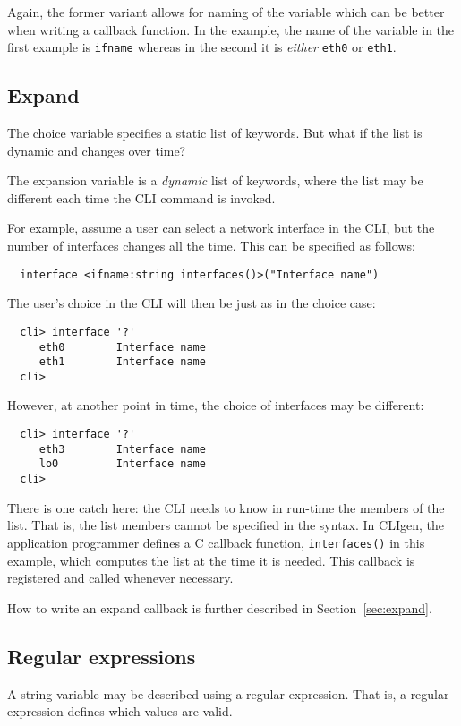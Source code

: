 \documentclass[a4paper, 10pt] {article}
\begin{document}
Again, the former variant allows for naming of the variable which can
be better when writing a callback function. In the example, the name
of the variable in the first example is {\tt ifname} whereas in the
second it is \emph{either} {\tt eth0} or {\tt eth1}.

\subsection{Expand}
\label{sec:expand1}
The choice variable specifies a static list of
keywords. But what if the list is dynamic and changes over time?

The expansion variable is a \emph{dynamic} list of keywords, where the
list may be different each time the CLI command is invoked.

For example, assume a user can select a network interface in the CLI,
but the number of interfaces changes all the time. This can be
specified as follows:

\begin{verbatim}
  interface <ifname:string interfaces()>("Interface name")
\end{verbatim}
The user's choice in the CLI will then be just as in the choice case:
\begin{verbatim}
  cli> interface '?'
     eth0        Interface name
     eth1        Interface name
  cli> 
\end{verbatim}

However, at another point in time, the choice of interfaces may be different:
\begin{verbatim}
  cli> interface '?'
     eth3        Interface name
     lo0         Interface name
  cli> 
\end{verbatim}

There is one catch here: the CLI needs to know in run-time the members
of the list. That is, the list members cannot be specified in the
syntax.  In CLIgen, the application programmer defines a C callback
function, {\tt interfaces()} in this example, which computes the list
at the time it is needed. This callback is registered and called
whenever necessary.

How to write an expand callback is further described in
Section~\ref{sec:expand}.

\subsection{Regular expressions}

A string variable may be described using a regular expression. That
is, a regular expression defines which values are valid. 
\end{document}
